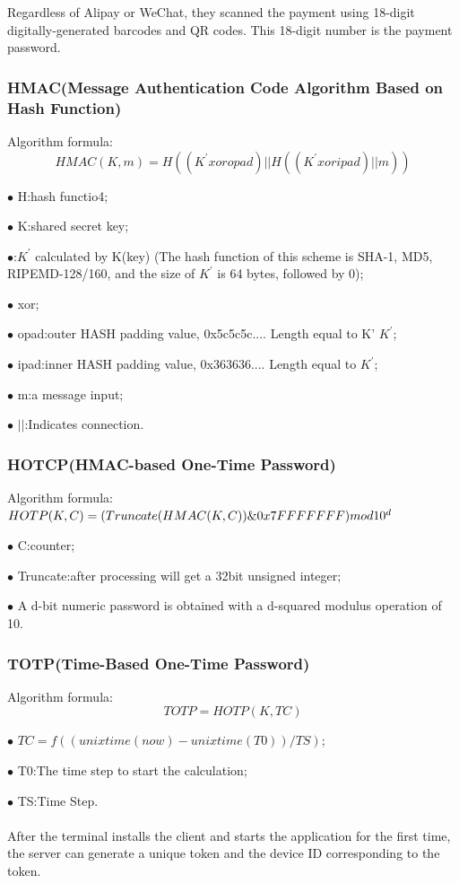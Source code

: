 \documentclass[journal]{IEEEtran}
\begin{document}
Regardless of Alipay or WeChat, they scanned the payment using 18-digit digitally-generated barcodes and QR codes. This 18-digit number is the payment password. 


\subsubsection{HMAC(Message Authentication Code Algorithm Based on Hash Function)}
Algorithm formula:
$$HMAC(K, m) = H((K^{\prime} xor opad) || H ((K^{\prime} xor ipad) || m)) $$

$\bullet$ H:hash functio4;

$\bullet$ K:shared secret key;

$\bullet$:$K^{\prime}$ calculated by K(key) (The hash function of this scheme is SHA-1, MD5, RIPEMD-128/160, and the size of $K^{\prime}$ is 64 bytes, followed by 0);

$\bullet$ xor;

$\bullet$ opad:outer HASH padding value, 0x5c5c5c.... Length equal to K’ $K^{\prime}$;

$\bullet$ ipad:inner HASH padding value, 0x363636.... Length equal to  $K^{\prime}$;

$\bullet$ m:a message input;

$\bullet$ $||$:Indicates connection.

\subsubsection{HOTCP(HMAC-based One-Time Password)}
Algorithm formula:
\\
$HOTP(K,C) = (Truncate(HMAC(K,C))\&0x7FFFFFFF) 
\\mod 10^{d}$

$\bullet$ C:counter;

$\bullet$ Truncate:after processing will get a 32bit unsigned integer;

$\bullet$ A d-bit numeric password is obtained with a d-squared modulus operation of 10.
\subsubsection{TOTP(Time-Based One-Time Password)}
Algorithm formula:
\\
$$TOTP = HOTP(K, TC)$$

$\bullet$ $TC=f((unixtime(now) − unixtime(T0)) / TS)$;

$\bullet$ T0:The time step to start the calculation;

$\bullet$ TS:Time Step.
\\
\\
After the terminal installs the client and starts the application for the first time, the server can generate a unique token and the device ID corresponding to the token.
\end{document}
